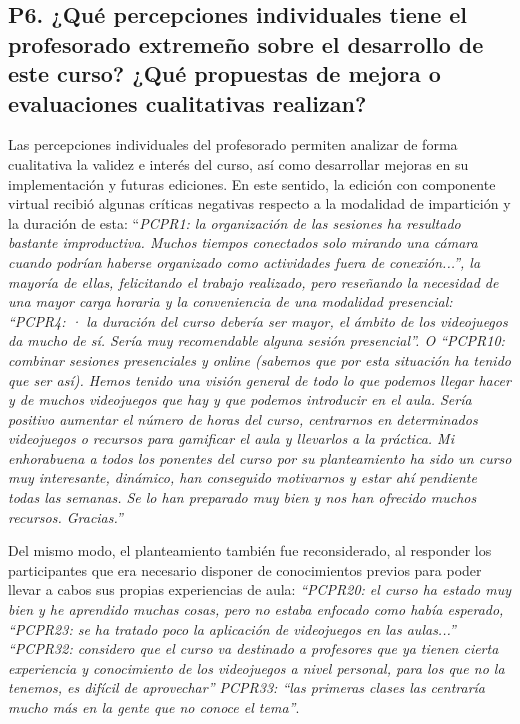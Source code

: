 \documentclass[spanish]{textolivre}
\begin{document}
\subsection{P6. ¿Qué percepciones individuales tiene el profesorado extremeño sobre el desarrollo de este curso? ¿Qué propuestas de mejora o evaluaciones cualitativas realizan?}\label{sec-outras-estr}
Las percepciones individuales del profesorado permiten analizar de forma cualitativa la validez e interés del curso, así como desarrollar mejoras en su implementación y futuras ediciones. En este sentido, la edición con componente virtual recibió algunas críticas negativas respecto a la modalidad de impartición y la duración de esta: “\textit{PCPR1: la organización de las sesiones ha resultado bastante improductiva. Muchos tiempos conectados solo mirando una cámara cuando podrían haberse organizado como actividades fuera de conexión...”, la mayoría de ellas, felicitando el trabajo realizado, pero reseñando la necesidad de una mayor carga horaria y la conveniencia de una modalidad presencial: “PCPR4: · la duración del curso debería ser mayor, el ámbito de los videojuegos da mucho de sí. Sería muy recomendable alguna sesión presencial”. O “PCPR10: combinar sesiones presenciales y online (sabemos que por esta situación ha tenido que ser así). Hemos tenido una visión general de todo lo que podemos llegar hacer y de muchos videojuegos que hay y que podemos introducir en el aula. Sería positivo aumentar el número de horas del curso, centrarnos en determinados videojuegos o recursos para gamificar el aula y llevarlos a la práctica. Mi enhorabuena a todos los ponentes del curso por su planteamiento ha sido un curso muy interesante, dinámico, han conseguido motivarnos y estar ahí pendiente todas las semanas. Se lo han preparado muy bien y nos han ofrecido muchos recursos. Gracias.”}

Del mismo modo, el planteamiento también fue reconsiderado, al responder los participantes que era necesario disponer de conocimientos previos para poder llevar a cabos sus propias experiencias de aula: \textit{“PCPR20: el curso ha estado muy bien y he aprendido muchas cosas, pero no estaba enfocado como había esperado, “PCPR23: se ha tratado poco la aplicación de videojuegos en las aulas...” “PCPR32: considero que el curso va destinado a profesores que ya tienen cierta experiencia y conocimiento de los videojuegos a nivel personal, para los que no la tenemos, es difícil de aprovechar” PCPR33: “las primeras clases las centraría mucho más en la gente que no conoce el tema”}.
\end{document}
